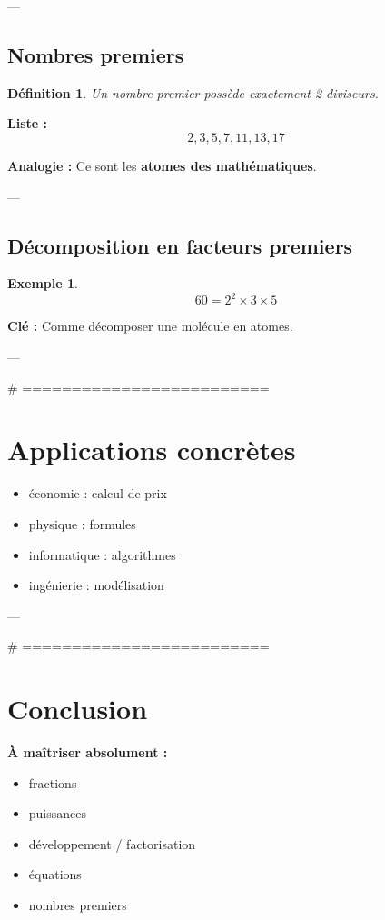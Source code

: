 \documentclass[11pt,a4paper]{article}
\newtheorem{definition}{Définition}
\newtheorem{example}{Exemple}
\begin{document}
---

\subsection{Nombres premiers}

\begin{definition}
Un nombre premier possède exactement 2 diviseurs.
\end{definition}

\textbf{Liste :}
\[
2,3,5,7,11,13,17
\]

\textbf{Analogie :}
Ce sont les \textbf{atomes des mathématiques}.

---

\subsection{Décomposition en facteurs premiers}

\begin{example}
\[
60 = 2^2 \times 3 \times 5
\]
\end{example}

\textbf{Clé :}
Comme décomposer une molécule en atomes.

---

# =========================
\section{Applications concrètes}

\begin{itemize}
\item économie : calcul de prix
\item physique : formules
\item informatique : algorithmes
\item ingénierie : modélisation
\end{itemize}

---

# =========================
\section{Conclusion}

\textbf{À maîtriser absolument :}
\begin{itemize}
\item fractions
\item puissances
\item développement / factorisation
\item équations
\item nombres premiers
\end{itemize}

\bigskip
\end{document}
